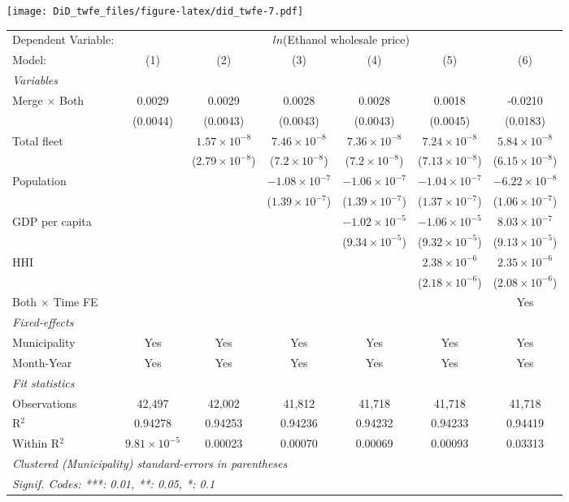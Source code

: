 \documentclass[
]{article}
\begin{document}
\texttt{[image: DiD\_twfe\_files/figure-latex/did\_twfe-7.pdf]}

\begin{tabular}{lcccccc}
\tabularnewline\midrule\midrule
Dependent Variable:&\multicolumn{6}{c}{$ln$(Ethanol wholesale price)}\\
Model:&(1) & (2) & (3) & (4) & (5) & (6)\\
\midrule \emph{Variables}&   &   &   &   &   &  \\
Merge $\times $ Both & 0.0029 & 0.0029 & 0.0028 & 0.0028 & 0.0018 & -0.0210\\
  &(0.0044) & (0.0043) & (0.0043) & (0.0043) & (0.0045) & (0.0183)\\
Total fleet &    & $1.57\times 10^{-8}$ & $7.46\times 10^{-8}$ & $7.36\times 10^{-8}$ & $7.24\times 10^{-8}$ & $5.84\times 10^{-8}$\\
  &   & ($2.79\times 10^{-8}$) & ($7.2\times 10^{-8}$) & ($7.2\times 10^{-8}$) & ($7.13\times 10^{-8}$) & ($6.15\times 10^{-8}$)\\
Population &    &    & $-1.08\times 10^{-7}$ & $-1.06\times 10^{-7}$ & $-1.04\times 10^{-7}$ & $-6.22\times 10^{-8}$\\
  &   &    & ($1.39\times 10^{-7}$) & ($1.39\times 10^{-7}$) & ($1.37\times 10^{-7}$) & ($1.06\times 10^{-7}$)\\
GDP per capita &    &    &    & $-1.02\times 10^{-5}$ & $-1.06\times 10^{-5}$ & $8.03\times 10^{-7}$\\
  &   &    &    & ($9.34\times 10^{-5}$) & ($9.32\times 10^{-5}$) & ($9.13\times 10^{-5}$)\\
HHI &    &    &    &    & $2.38\times 10^{-6}$ & $2.35\times 10^{-6}$\\
  &   &    &    &    & ($2.18\times 10^{-6}$) & ($2.08\times 10^{-6}$)\\
Both $\times$ Time FE &  &  &  &  &  & Yes\\
\midrule \emph{Fixed-effects}&   &   &   &   &   &  \\
Municipality & Yes & Yes & Yes & Yes & Yes & Yes\\
Month-Year & Yes & Yes & Yes & Yes & Yes & Yes\\
\midrule \emph{Fit statistics}&  & & & & & \\
Observations & 42,497&42,002&41,812&41,718&41,718&41,718\\
R$^2$ & 0.94278&0.94253&0.94236&0.94232&0.94233&0.94419\\
Within R$^2$ & $9.81\times 10^{-5}$&0.00023&0.00070&0.00069&0.00093&0.03313\\
\midrule\midrule\multicolumn{7}{l}{\emph{Clustered (Municipality) standard-errors in parentheses}}\\
\multicolumn{7}{l}{\emph{Signif. Codes: ***: 0.01, **: 0.05, *: 0.1}}\\
\end{tabular}
\end{document}
